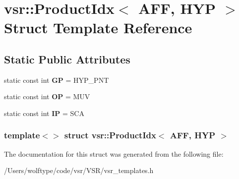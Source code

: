 \hypertarget{structvsr_1_1_product_idx_3_01_a_f_f_00_01_h_y_p_01_4}{\section{vsr\-:\-:Product\-Idx$<$ A\-F\-F, H\-Y\-P $>$ Struct Template Reference}
\label{structvsr_1_1_product_idx_3_01_a_f_f_00_01_h_y_p_01_4}
}
\subsection*{Static Public Attributes}
\begin{DoxyCompactItemize}
\item 
\hypertarget{structvsr_1_1_product_idx_3_01_a_f_f_00_01_h_y_p_01_4_a66f927695a65f492510a00e983419f99}{static const int {\bfseries G\-P} = H\-Y\-P\-\_\-\-P\-N\-T}\label{structvsr_1_1_product_idx_3_01_a_f_f_00_01_h_y_p_01_4_a66f927695a65f492510a00e983419f99}

\item 
\hypertarget{structvsr_1_1_product_idx_3_01_a_f_f_00_01_h_y_p_01_4_ab64b705c920c70006f79bb2f7876089c}{static const int {\bfseries O\-P} = M\-U\-V}\label{structvsr_1_1_product_idx_3_01_a_f_f_00_01_h_y_p_01_4_ab64b705c920c70006f79bb2f7876089c}

\item 
\hypertarget{structvsr_1_1_product_idx_3_01_a_f_f_00_01_h_y_p_01_4_ae9658f14781dd33655599e42f2190dcb}{static const int {\bfseries I\-P} = S\-C\-A}\label{structvsr_1_1_product_idx_3_01_a_f_f_00_01_h_y_p_01_4_ae9658f14781dd33655599e42f2190dcb}

\end{DoxyCompactItemize}
\subsubsection*{template$<$$>$ struct vsr\-::\-Product\-Idx$<$ A\-F\-F, H\-Y\-P $>$}



The documentation for this struct was generated from the following file\-:\begin{DoxyCompactItemize}
\item 
/\-Users/wolftype/code/vsr/\-V\-S\-R/vsr\-\_\-templates.\-h\end{DoxyCompactItemize}
